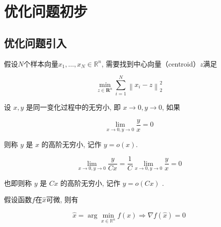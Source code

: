 \chapter{优化问题初步}
    
\section{优化问题引入}

\begin{problem}
    \label{Problem:ClusteringCenter}
    假设$N$个样本向量$ x_{1}, \ldots, x_{N} \in \mathbb{R}^{n} $, 需要找到中心向量（centroid）$z$满足

    $$ \min _{z \in \mathbf{R}^{n}} \sum_{i=1}^{N}\left\|x_{i}-z\right\|_{2}^{2} $$
\end{problem}

\begin{definition}[高阶无穷小(记号 $o$)]
    设 $ x, y $ 是同一变化过程中的无穷小, 即 $ x \rightarrow 0, y \rightarrow 0 $, 如果

$$
\lim_{x \rightarrow 0, y \rightarrow 0} \frac{y}{x}=0
$$

则称 $ y $ 是 $ x $ 的高阶无穷小, 记作 $ y=o(x) $.
\end{definition}

\begin{corollary}
    $$ \lim_{x \rightarrow 0, y \rightarrow 0} \frac{y}{C x}=\frac{1}{C} \lim_{x \rightarrow 0, y \rightarrow 0} \frac{y}{x}=0 $$

    也即则称 $ y $ 是 $ C x $ 的高阶无穷小, 记作 $ y=o(C x) $ . 
\end{corollary}

\begin{theorem}[凸优化求解的必要条件]
    假设函数$f$在$\hat{x}$可微, 则有

    $$ \hat{x}=\arg \min _{x \in \mathbb{R}^{n}} f(x) \Rightarrow \nabla f(\hat{x})=0 $$
\end{theorem}

